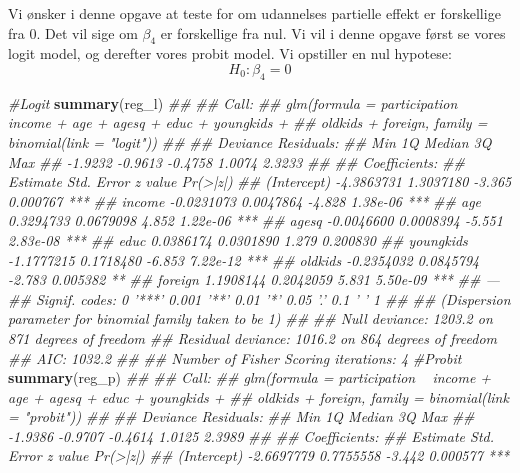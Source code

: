 \documentclass[
  10pt,
]{article}
\newenvironment{Shaded}{\begin{snugshade}}{\end{snugshade}}
\newcommand{\CommentTok}[1]{\textcolor[rgb]{0.56,0.35,0.01}{\textit{#1}}}
\newcommand{\KeywordTok}[1]{\textcolor[rgb]{0.13,0.29,0.53}{\textbf{#1}}}
\newcommand{\NormalTok}[1]{#1}
\begin{document}
Vi ønsker i denne opgave at teste for om udannelses partielle effekt er
forskellige fra 0. Det vil sige om \(\beta_4\) er forskellige fra nul.
Vi vil i denne opgave først se vores logit model, og derefter vores
probit model. Vi opstiller en nul hypotese: \[H_0:\beta_4=0\]

\begin{Shaded}
\begin{Highlighting}[]
\CommentTok{#Logit}
\KeywordTok{summary}\NormalTok{(reg_l)}
\CommentTok{## }
\CommentTok{## Call:}
\CommentTok{## glm(formula = participation ~ income + age + agesq + educ + youngkids + }
\CommentTok{##     oldkids + foreign, family = binomial(link = "logit"))}
\CommentTok{## }
\CommentTok{## Deviance Residuals: }
\CommentTok{##     Min       1Q   Median       3Q      Max  }
\CommentTok{## -1.9232  -0.9613  -0.4758   1.0074   2.3233  }
\CommentTok{## }
\CommentTok{## Coefficients:}
\CommentTok{##               Estimate Std. Error z value Pr(>|z|)    }
\CommentTok{## (Intercept) -4.3863731  1.3037180  -3.365 0.000767 ***}
\CommentTok{## income      -0.0231073  0.0047864  -4.828 1.38e-06 ***}
\CommentTok{## age          0.3294733  0.0679098   4.852 1.22e-06 ***}
\CommentTok{## agesq       -0.0046600  0.0008394  -5.551 2.83e-08 ***}
\CommentTok{## educ         0.0386174  0.0301890   1.279 0.200830    }
\CommentTok{## youngkids   -1.1777215  0.1718480  -6.853 7.22e-12 ***}
\CommentTok{## oldkids     -0.2354032  0.0845794  -2.783 0.005382 ** }
\CommentTok{## foreign      1.1908144  0.2042059   5.831 5.50e-09 ***}
\CommentTok{## ---}
\CommentTok{## Signif. codes:  0 '***' 0.001 '**' 0.01 '*' 0.05 '.' 0.1 ' ' 1}
\CommentTok{## }
\CommentTok{## (Dispersion parameter for binomial family taken to be 1)}
\CommentTok{## }
\CommentTok{##     Null deviance: 1203.2  on 871  degrees of freedom}
\CommentTok{## Residual deviance: 1016.2  on 864  degrees of freedom}
\CommentTok{## AIC: 1032.2}
\CommentTok{## }
\CommentTok{## Number of Fisher Scoring iterations: 4}
\CommentTok{#Probit}
\KeywordTok{summary}\NormalTok{(reg_p)}
\CommentTok{## }
\CommentTok{## Call:}
\CommentTok{## glm(formula = participation ~ income + age + agesq + educ + youngkids + }
\CommentTok{##     oldkids + foreign, family = binomial(link = "probit"))}
\CommentTok{## }
\CommentTok{## Deviance Residuals: }
\CommentTok{##     Min       1Q   Median       3Q      Max  }
\CommentTok{## -1.9386  -0.9707  -0.4614   1.0125   2.3989  }
\CommentTok{## }
\CommentTok{## Coefficients:}
\CommentTok{##               Estimate Std. Error z value Pr(>|z|)    }
\CommentTok{## (Intercept) -2.6697779  0.7755558  -3.442 0.000577 ***}

\end{Highlighting}
\end{Shaded}
\end{document}
